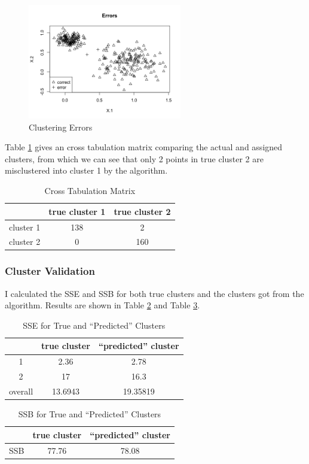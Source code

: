 \documentclass{article}
\begin{document}
		\begin{figure}[H]
		\centering
		\includegraphics[width = 0.6\textwidth]{easy_errors.png}
		\caption{Clustering Errors}
		\label{fig:easy-error}
		\end{figure}

		Table \ref{tbl:cross-easy} gives an cross tabulation matrix comparing the actual and assigned clusters, from which we can see that only 2 points in true cluster 2 are misclustered into cluster 1 by the algorithm. 

		\begin{table}[H]
		\centering
			\begin{tabular}{|c||c|c|}
			\hline
			 & true cluster 1 & true cluster 2 \\
			 \hline
			 \hline
			 cluster 1 & 138 & 2 \\
			 \hline
			 cluster 2 & 0 & 160 \\
			 \hline
			\end{tabular}
			\caption{Cross Tabulation Matrix}
			\label{tbl:cross-easy}
		\end{table}

		\subsubsection{Cluster Validation}
			I calculated the SSE and SSB for both true clusters and the clusters got from the algorithm. Results are shown in Table \ref{tbl:sse-easy} and Table \ref{tbl:ssb-easy}.

			\begin{table}[H]
			\centering
				\begin{tabular}{|c|c|c|}
					\hline
					& true cluster & ``predicted'' cluster \\ 
					\hline
					1 & 2.36 & 2.78 \\
					\hline
					2 & 17 & 16.3 \\
					\hline
					overall & 13.6943 & 19.35819 \\
					\hline
				\end{tabular}
				\caption{SSE for True and ``Predicted'' Clusters}
				\label{tbl:sse-easy}
			\end{table}
			\begin{table}[H]
			\centering
				\begin{tabular}{|c|c|c|}
					\hline
					& true cluster & ``predicted'' cluster \\ 
					\hline
					SSB & 77.76 & 78.08 \\ 
					\hline
				\end{tabular}
				\caption{SSB for True and ``Predicted'' Clusters}
				\label{tbl:ssb-easy}
			\end{table}
\end{document}
